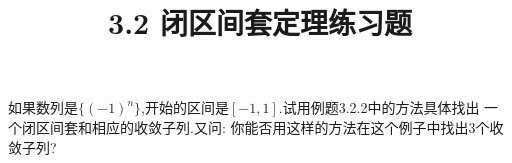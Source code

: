 \documentclass[windows,list,answers]{BHCexam}
\begin{document}
\everymath{\displaystyle}
\title{3.2 闭区间套定理\quad 练习题}

\maketitle

\begin{questions}
    \question
    如果数列是$\{(-1)^n\}$,开始的区间是$[-1,1]$.试用例题3.2.2中的方法具体找出
    一个闭区间套和相应的收敛子列.又问: 你能否用这样的方法在这个例子中找出3个收敛子列?
    \begin{solution}{1cm}
        \methodonly
        
    \end{solution}
\end{questions}
\end{document}
